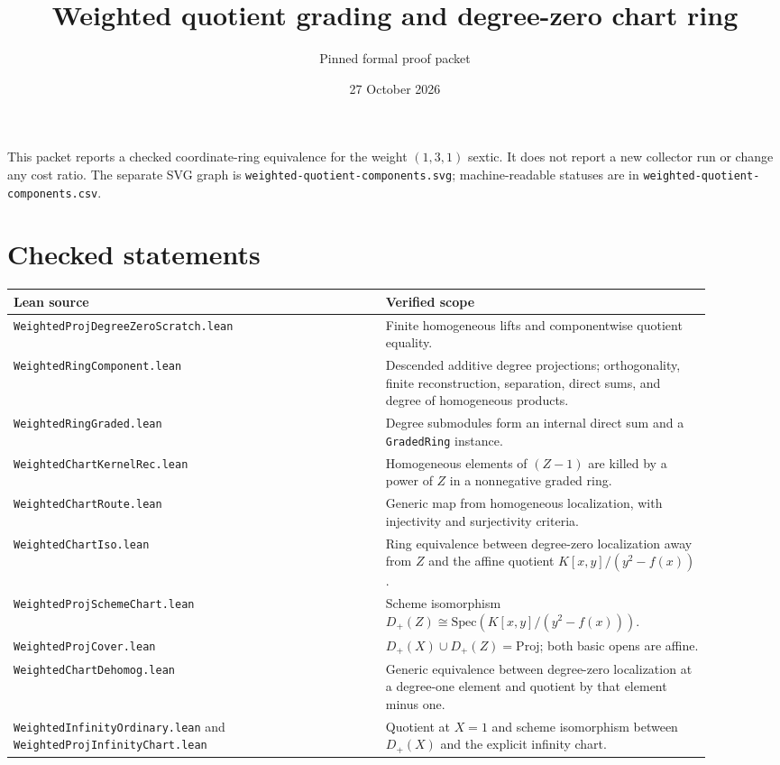 \documentclass[10pt]{article}
\title{Weighted quotient grading and degree-zero chart ring}
\author{Pinned formal proof packet}
\date{27 October 2026}
\begin{document}
\maketitle
\noindent This packet reports a checked coordinate-ring equivalence for the weight $(1,3,1)$ sextic. It does not report a new collector run or change any cost ratio. The separate SVG graph is \texttt{weighted-quotient-components.svg}; machine-readable statuses are in \texttt{weighted-quotient-components.csv}.
\section*{Checked statements}
\begin{longtable}{p{0.48\linewidth}p{0.42\linewidth}}
\toprule
Lean source & Verified scope\\
\midrule
\texttt{WeightedProjDegreeZeroScratch.lean} & Finite homogeneous lifts and componentwise quotient equality.\\
\texttt{WeightedRingComponent.lean} & Descended additive degree projections; orthogonality, finite reconstruction, separation, direct sums, and degree of homogeneous products.\\
\texttt{WeightedRingGraded.lean} & Degree submodules form an internal direct sum and a \texttt{GradedRing} instance.\\
\texttt{WeightedChartKernelRec.lean} & Homogeneous elements of $(Z-1)$ are killed by a power of $Z$ in a nonnegative graded ring.\\
\texttt{WeightedChartRoute.lean} & Generic map from homogeneous localization, with injectivity and surjectivity criteria.\\
\texttt{WeightedChartIso.lean} & Ring equivalence between degree-zero localization away from $Z$ and the affine quotient $K[x,y]/(y^2-f(x))$.\\
\texttt{WeightedProjSchemeChart.lean} & Scheme isomorphism $D_+(Z) \cong \mathrm{Spec}(K[x,y]/(y^2-f(x)))$.\\
\texttt{WeightedProjCover.lean} & $D_+(X)\cup D_+(Z)=\mathrm{Proj}$; both basic opens are affine.\\
\texttt{WeightedChartDehomog.lean} & Generic equivalence between degree-zero localization at a degree-one element and quotient by that element minus one.\\
\texttt{WeightedInfinityOrdinary.lean} and \texttt{WeightedProjInfinityChart.lean} & Quotient at $X=1$ and scheme isomorphism between $D_+(X)$ and the explicit infinity chart.\\

\end{longtable}
\end{document}
